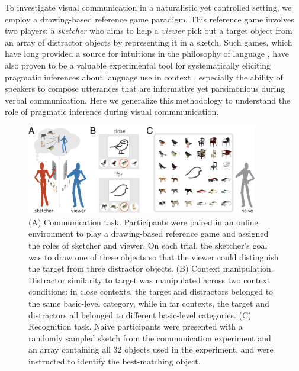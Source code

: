 \documentclass{svjour3}
\begin{document}
To investigate visual communication in a naturalistic yet controlled setting, we employ a drawing-based reference game paradigm.
This reference game involves two players: a \textit{sketcher} who aims to help a \textit{viewer} pick out a target object from an array of distractor objects by representing it in a sketch. 
Such games, which have long provided a source for intuitions in the philosophy of language \citep*{wittgenstein1953philosophical,Lewis69_Convention}, have also proven to be a valuable experimental tool for systematically eliciting pragmatic inferences about language use in context \citep*{goodman2016pragmatic,kao2014formalizing,goodman2013knowledge,frank2012predicting}, especially the ability of speakers to compose utterances that are informative \citep*{grice1975syntax,wilson1986relevance} yet parsimonious \citep*{zipf1936psycho} during verbal communication. 
Here we generalize this methodology to understand the role of pragmatic inference during visual commmunication. 

\begin{figure}[htbp]
\centering
\includegraphics[width=0.9\textwidth]{1_task_display_2.png}
\caption{(A) Communication task. Participants were paired in an online environment to play a drawing-based reference game and assigned the roles of sketcher and viewer. On each trial, the sketcher's goal was to draw one of these objects so that the viewer could distinguish the target from three distractor objects. (B) Context manipulation. Distractor similarity to target was manipulated across two context conditions: in close contexts, the target and distractors belonged to the same basic-level category, while in far contexts, the target and distractors all belonged to different basic-level categories. (C) Recognition task. Naive participants were presented with a randomly sampled sketch from the communication experiment and an array containing all 32 objects used in the experiment, and were instructed to identify the best-matching object.}
\label{task_display}
\end{figure}
\end{document}
